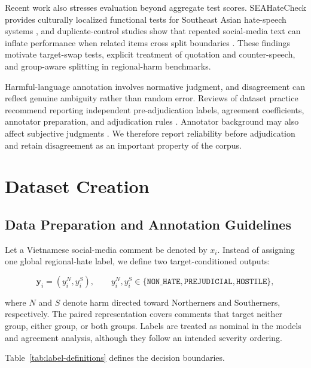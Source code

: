 \documentclass[11pt]{article}
\begin{document}
Recent work also stresses evaluation beyond aggregate test scores. SEAHateCheck provides culturally localized functional tests for Southeast Asian hate-speech systems \cite{ng2026seahatecheck}, and duplicate-control studies show that repeated social-media text can inflate performance when related items cross split boundaries \cite{mu2024dedup}. These findings motivate target-swap tests, explicit treatment of quotation and counter-speech, and group-aware splitting in regional-harm benchmarks.

Harmful-language annotation involves normative judgment, and disagreement can reflect genuine ambiguity rather than random error. Reviews of dataset practice recommend reporting independent pre-adjudication labels, agreement coefficients, annotator preparation, and adjudication rules \cite{klie2024quality,wang2025weber}. Annotator background may also affect subjective judgments \cite{fleisig2023majority}. We therefore report reliability before adjudication and retain disagreement as an important property of the corpus.

\section{Dataset Creation}

\subsection{Data Preparation and Annotation Guidelines}

Let a Vietnamese social-media comment be denoted by $x_i$. Instead of assigning one global regional-hate label, we define two target-conditioned outputs:

\begin{equation}
  \mathbf{y}_i = \left(y_i^{N}, y_i^{S}\right), \qquad
  y_i^{N},y_i^{S}\in
  \{\texttt{NON\_HATE},\texttt{PREJUDICIAL},\texttt{HOSTILE}\},
\end{equation}

where $N$ and $S$ denote harm directed toward Northerners and Southerners, respectively. The paired representation covers comments that target neither group, either group, or both groups. Labels are treated as nominal in the models and agreement analysis, although they follow an intended severity ordering.

Table~\ref{tab:label-definitions} defines the decision boundaries.
\end{document}
